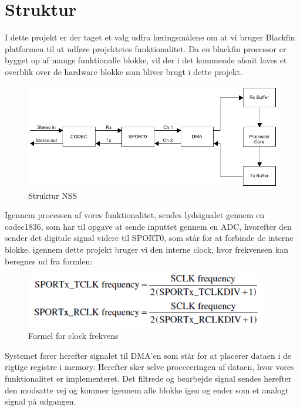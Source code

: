 \graphicspath{{Chapters/Struktur/}}

\section{Struktur}

I dette projekt er der taget et valg udfra læringsmålene om at vi bruger Blackfin platformen til at udføre projektetes funktionalitet. Da en blackfin processor er bygget op af mange funktionalle blokke, vil der i det kommende afsnit laves et overblik over de hardware blokke som bliver brugt i dette projekt. 

\begin{figure}[H]
	\centering
	\includegraphics[width = 400pt]{Img/Struktur}
	\caption{Struktur NSS}
	\label{fig:LMS_filter}
\end{figure}

Igennem processen af vores funktionalitet, sendes lydsignalet gennem en codec1836, som har til opgave at sende inputtet gennem en ADC, hvorefter den sender det digitale signal videre til SPORT0, som står for at forbinde de interne blokke, igennem dette projekt bruger vi den interne clock, hvor frekvensen kan beregnes ud fra formlen:

\begin{figure}[H]
	\centering
	\includegraphics[width = 300pt]{Img/Frekvens}
	\caption{Formel for clock frekvens}
	\label{fig:LMS_filter}
\end{figure}
  
Systemet fører herefter signalet til DMA'en som står for at placerer dataen i de rigtige registre i memory. Herefter sker selve proceceringen af dataen, hvor vores funktionalitet er implementeret. Det filtrede og bearbejde signal sendes herefter den modsatte vej og kommer igennem alle blokke igen og ender som et analogt signal på udgangen. 

\newpage

